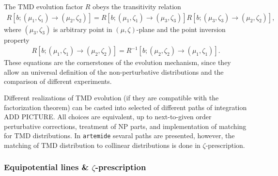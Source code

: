 \documentclass[prd,nofootinbib,eqsecnum,final]{revtex4}
\renewcommand{\(}{\left(}
\renewcommand{\)}{\right)}
\renewcommand{\[}{\left[}
\renewcommand{\]}{\right]}
\newcommand{\red}[1]{{\color[rgb]{1,0,0} #1}}
\begin{document}
The TMD evolution factor $R$ obeys the transitivity relation
\begin{eqnarray}\label{th:transitivity}
R[b;(\mu_1,\zeta_1)\to (\mu_2,\zeta_2)]=R[b;(\mu_1,\zeta_1)\to (\mu_3,\zeta_3)]R[b;(\mu_3,\zeta_3)\to (\mu_2,\zeta_2)],
\end{eqnarray}
where $(\mu_3,\zeta_3)$ is arbitrary point in $(\mu,\zeta)$-plane and the  point inversion property
\begin{eqnarray}\label{th:inversion}
R[b;(\mu_1,\zeta_1)\to (\mu_2,\zeta_2)]=R^{-1}[b;(\mu_2,\zeta_2)\to (\mu_1,\zeta_1)].
\end{eqnarray}
These equations are the cornerstones of the evolution mechanism, since they allow an universal definition of the non-perturbative distributions and the comparison of different experiments. 

Different realizations of TMD evolution (if they are compatible with the factorization theorem) can be casted into selected of different paths of integration \red{ADD PICTURE}. All choices are equivalent, up to next-to-given order perturbative corrections, treatment of NP parts, and implementation of matching for TMD distributions. In \texttt{artemide} sevaral paths are presented, however, the matching of TMD distribution to collinear distributions is done in $\zeta$-prescription.

\subsubsection{Equipotential lines \& $\zeta$-prescription}
\end{document}
